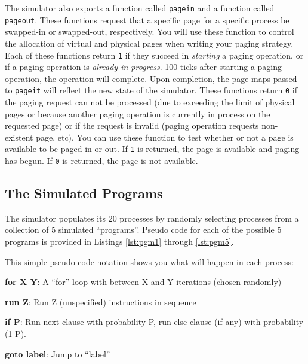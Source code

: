\documentclass[12pt]{article}
\newenvironment{packed_item}{
\begin{itemize}
  \setlength{\itemsep}{1pt}
  \setlength{\parskip}{0pt}
  \setlength{\parsep}{0pt}
}{\end{itemize}}
\begin{document}
The simulator also exports a function called \texttt{pagein} and a
function called \texttt{pageout}. These functions request that a
specific page for a specific process be swapped-in or swapped-out,
respectively. You will use these function to control the allocation of
virtual and physical pages when writing your paging strategy. Each of
these functions return \texttt{1} if they succeed in \emph{starting} a
paging operation, or if a paging operation is \emph{already in
  progress}. 100 ticks after starting a paging operation, the
operation will complete. Upon completion, the page maps passed
to \texttt{pageit}
will reflect the new state of the simulator. These functions return
\texttt{0} if the paging request can not be processed (due to
exceeding the limit of physical pages or because another paging
operation is currently in process on the requested page) or if the
request is invalid (paging operation requests non-existent page,
etc). You can use these function to test whether or not a page is
available to be paged in or out.
If \texttt{1} is returned, the page is available
and paging has begun. If \texttt{0} is returned, the page is not
available.

\subsection {The Simulated Programs}

The simulator populates its 20 processes by randomly selecting processes
from a collection of 5 simulated ``programs''. Pseudo code for each of
the possible 5 programs is provided in Listings \ref{lst:pgm1} through
\ref{lst:pgm5}.











This simple pseudo code notation shows you what will happen in each
process:
\begin{packed_item}
\item {\bf for X Y}: A ``for'' loop with between X and Y iterations
  (chosen randomly)
\item {\bf run Z}: Run Z (unspecified) instructions in sequence
\item {\bf if P}: Run next clause with probability P,
  run else clause (if any) with probability (1-P).
\item {\bf goto label}: Jump to ``label''
\end{packed_item}
\end{document}
